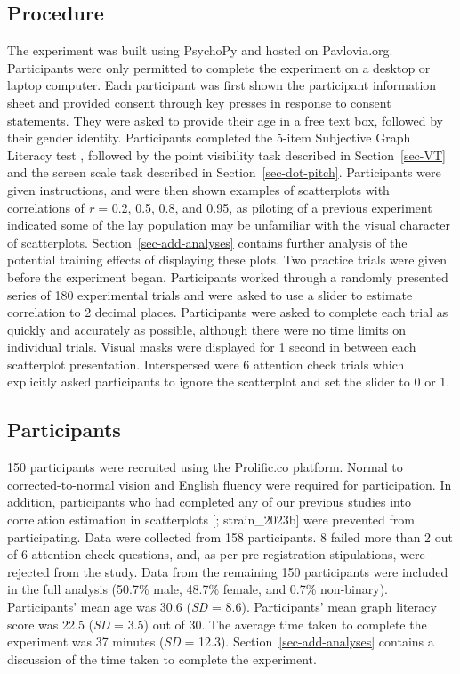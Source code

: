 \documentclass[sigconf]{acmart}
\begin{document}
\hypertarget{sec-gen-procedure}{%
\subsection{Procedure}\label{sec-gen-procedure}}

The experiment was built using PsychoPy \citep{pierce_2019} and hosted
on Pavlovia.org. Participants were only permitted to complete the
experiment on a desktop or laptop computer. Each participant was first
shown the participant information sheet and provided consent through key
presses in response to consent statements. They were asked to provide
their age in a free text box, followed by their gender identity.
Participants completed the 5-item Subjective Graph Literacy test
\citep{garcia_2016}, followed by the point visibility task described in
Section~\ref{sec-VT} and the screen scale task described in
Section~\ref{sec-dot-pitch}. Participants were given instructions, and
were then shown examples of scatterplots with correlations of \emph{r} =
0.2, 0.5, 0.8, and 0.95, as piloting of a previous experiment indicated
some of the lay population may be unfamiliar with the visual character
of scatterplots. Section~\ref{sec-add-analyses} contains further
analysis of the potential training effects of displaying these plots.
Two practice trials were given before the experiment began. Participants
worked through a randomly presented series of 180 experimental trials
and were asked to use a slider to estimate correlation to 2 decimal
places. Participants were asked to complete each trial as quickly and
accurately as possible, although there were no time limits on individual
trials. Visual masks were displayed for 1 second in between each
scatterplot presentation. Interspersed were 6 attention check trials
which explicitly asked participants to ignore the scatterplot and set
the slider to 0 or 1.

\hypertarget{sec-participants}{%
\subsection{Participants}\label{sec-participants}}

150 participants were recruited using the Prolific.co platform. Normal
to corrected-to-normal vision and English fluency were required for
participation. In addition, participants who had completed any of our
previous studies into correlation estimation in scatterplots
{[}\citet{strain_2023}; strain\_2023b{]} were prevented from
participating. Data were collected from 158 participants. 8 failed more
than 2 out of 6 attention check questions, and, as per pre-registration
stipulations, were rejected from the study. Data from the remaining 150
participants were included in the full analysis (50.7\% male, 48.7\%
female, and 0.7\% non-binary). Participants' mean age was 30.6
(\emph{SD} = 8.6). Participants' mean graph literacy score was 22.5
(\emph{SD} = 3.5) out of 30. The average time taken to complete the
experiment was 37 minutes (\emph{SD} = 12.3).
Section~\ref{sec-add-analyses} contains a discussion of the time taken
to complete the experiment.
\end{document}
